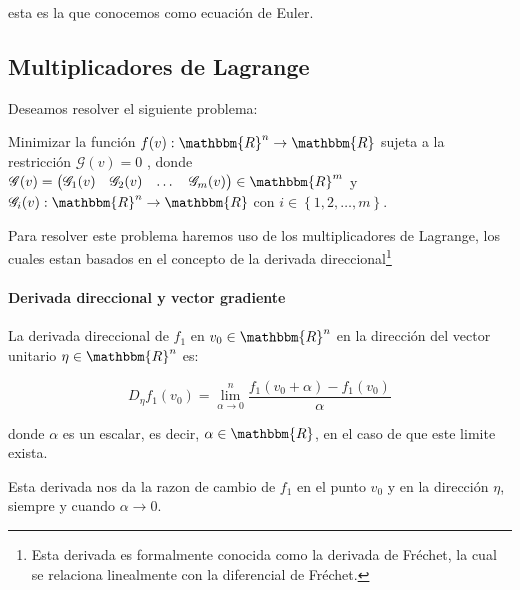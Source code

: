             esta es la que conocemos como ecuación de Euler.


        \subsection{Multiplicadores de Lagrange}

            Deseamos resolver el siguiente problema:

            Minimizar la función
            $f(v):\mathbbm{R}^n \to \mathbbm{R}$
            sujeta a la restricción $\mathscr{G}(v) = 0$
            , donde $\mathscr{G}(v)=\begin{pmatrix}\mathscr{G}_1(v) & \mathscr{G}_2(v) & \dots & \mathscr{G}_m(v) \end{pmatrix} \in \mathbbm{R}^m$
             y $\mathscr{G}_i(v): \mathbbm{R}^n \to \mathbbm{R}$
             con $i \in \left\{ 1, 2, \dots, m \right\}$.

            Para resolver este problema haremos uso de los multiplicadores de Lagrange, los cuales estan basados en el concepto de la derivada direccional\footnote{Esta derivada es formalmente conocida como la derivada de Fréchet, la cual se relaciona linealmente con la diferencial de Fréchet.}

            \paragraph{Derivada direccional y vector gradiente}

                \begin{definicion}
                    La derivada direccional de $f_1$ en $v_0 \in \mathbbm{R}^n$ en la dirección del vector unitario $\eta \in \mathbbm{R}^n$ es:

                    \begin{equation}
                        D_{\eta} f_1(v_0) = \lim_{\alpha \to 0}^{n}  \frac{f_1(v_0 + \alpha) - f_1(v_0)}{\alpha}
                    \end{equation}

                    donde $\alpha$ es un escalar, es decir, $\alpha \in \mathbbm{R}$, en el caso de que este limite exista.



                    Esta derivada nos da la razon de cambio de $f_1$ en el punto $v_0$ y en la dirección $\eta$, siempre y cuando $\alpha \to 0$.
                \end{definicion}

